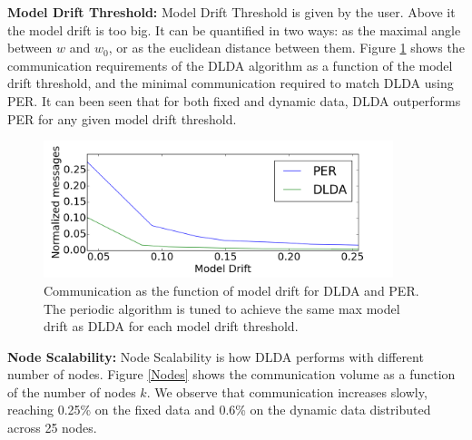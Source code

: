 \noindent\textbf{Model Drift Threshold:} Model Drift Threshold is given by the user. Above it the model drift is too big. It can be quantified in two ways: as the maximal angle between $w$ and $w_0$, or as the euclidean distance between them. 
Figure \ref{PERvsDLDAoverError} shows the communication requirements of the DLDA algorithm as a function of the model drift threshold, and the minimal communication required to match DLDA using PER.	
It can been seen that for both fixed and dynamic data, DLDA outperforms PER for
any given model drift threshold.
 \begin{figure}[ht]
	\centering
	\includegraphics[height=4cm]{PER/onlyDrift.png}
	\caption{Communication as the function of model drift for DLDA and PER. The
	periodic algorithm is tuned to achieve the same max model drift as DLDA
	for each model drift threshold.}
	\label{PERvsDLDAoverError}
	\end{figure}

	
\noindent\textbf{Node Scalability:}
Node Scalability is how DLDA performs with different number of nodes.
Figure \ref{Nodes} shows the communication volume as a function of the number of nodes $k$.
We observe that communication increases slowly, reaching 0.25\% on the fixed
data and 0.6\% on the dynamic data distributed across 25 nodes.

